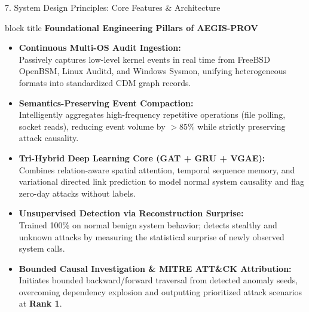 \documentclass[aspectratio=169,10pt]{beamer}
\begin{document}
\begin{frame}{7. System Design Principles: Core Features \& Architecture}
\vspace{0.15em}
\begin{beamercolorbox}[rounded=true,shadow=false,sep=0.32em,wd=\textwidth]{block title}
\textbf{\scriptsize Foundational Engineering Pillars of AEGIS-PROV}
\end{beamercolorbox}
\vspace{0.15em}
{\fontsize{7.6pt}{11.0pt}\selectfont
\begin{itemize}\itemsep0.25em
  \item \textbf{Continuous Multi-OS Audit Ingestion:}\\
  Passively captures low-level kernel events in real time from FreeBSD OpenBSM, Linux Auditd, and Windows Sysmon, unifying heterogeneous formats into standardized CDM graph records.
  \item \textbf{Semantics-Preserving Event Compaction:}\\
  Intelligently aggregates high-frequency repetitive operations (file polling, socket reads), reducing event volume by \textbf{$>85\%$} while strictly preserving attack causality.
  \item \textbf{Tri-Hybrid Deep Learning Core (GAT + GRU + VGAE):}\\
  Combines relation-aware spatial attention, temporal sequence memory, and variational directed link prediction to model normal system causality and flag zero-day attacks without labels.
  \item \textbf{Unsupervised Detection via Reconstruction Surprise:}\\
  Trained 100\% on normal benign system behavior; detects stealthy and unknown attacks by measuring the statistical surprise of newly observed system calls.
  \item \textbf{Bounded Causal Investigation \& MITRE ATT\&CK Attribution:}\\
  Initiates bounded backward/forward traversal from detected anomaly seeds, overcoming dependency explosion and outputting prioritized attack scenarios at \textbf{Rank 1}.
\end{itemize}
}
\end{frame}

\end{document}

